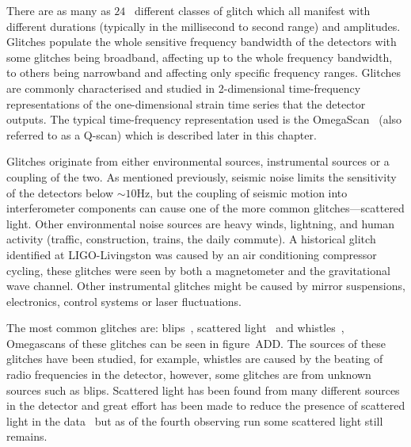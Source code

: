 
There are as many as $24$~\cite{gravityspy:2023} different classes of glitch which all manifest with different durations (typically in the millisecond to second range) and amplitudes. Glitches populate the whole sensitive frequency bandwidth of the detectors with some glitches being broadband, affecting up to the whole frequency bandwidth, to others being narrowband and affecting only specific frequency ranges. Glitches are commonly characterised and studied in 2-dimensional time-frequency representations of the one-dimensional strain time series that the detector outputs. The typical time-frequency representation used is the OmegaScan~\cite{} (also referred to as a Q-scan) which is described later in this chapter.


Glitches originate from either environmental sources, instrumental sources or a coupling of the two. As mentioned previously, seismic noise limits the sensitivity of the detectors below $\sim10$Hz, but the coupling of seismic motion into interferometer components can cause one of the more common glitches---scattered light. Other environmental noise sources are heavy winds, lightning, and human activity (traffic, construction, trains, the daily commute). A historical glitch identified at LIGO-Livingston was caused by an air conditioning compressor cycling, these glitches were seen by both a magnetometer and the gravitational wave channel. Other instrumental glitches might be caused by mirror suspensions, electronics, control systems or laser fluctuations.
%
%


The most common glitches are: blips~\cite{blips:2019}, scattered light~\cite{ArchEnemy:2023} and whistles~\cite{glitschen:2021}, Omegascans of these glitches can be seen in figure~ADD. The sources of these glitches have been studied, for example, whistles are caused by the beating of radio frequencies in the detector, however, some glitches are from unknown sources such as blips. Scattered light has been found from many different sources in the detector and great effort has been made to reduce the presence of scattered light in the data~\cite{reducing_scattering:2020} but as of the fourth observing run some scattered light still remains.
%
%


